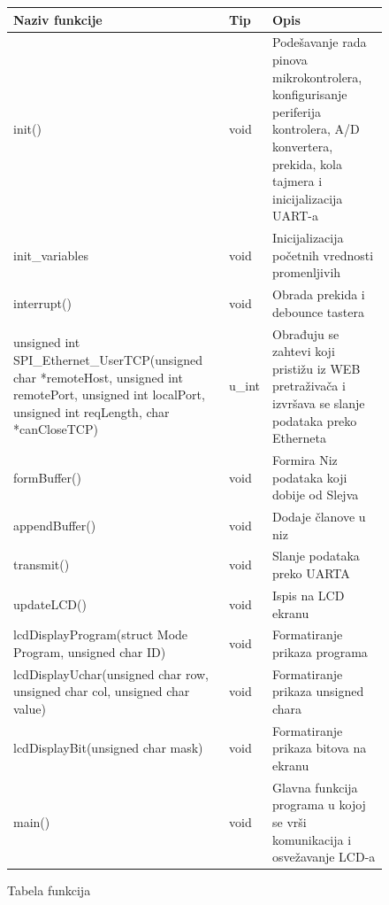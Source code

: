 \documentclass[12pt]{article}
\numberwithin{figure}{section}
\begin{document}
\begin{figure}[ht]
  \caption{Tabela funkcija}
\begin{centering}
  \begin{tabular}{|p{5cm}|p{2cm}|p{8cm}|}
    \hline
      Naziv funkcije & Tip & Opis \\
    \hline
      init() & void & Podešavanje rada pinova mikrokontrolera, konfigurisanje periferija kontrolera, A/D konvertera, prekida, kola tajmera i inicijalizacija UART-a \\
    \hline
      init\_variables & void & Inicijalizacija početnih vrednosti promenljivih \\
    \hline 
     interrupt() & void & Obrada prekida i debounce tastera\\ 
     \hline
     unsigned int SPI\_Ethernet\_UserTCP(unsigned char *remoteHost, unsigned int remotePort, unsigned int localPort, unsigned int reqLength, char *canCloseTCP) & u\_int & Obrađuju se zahtevi koji pristižu iz WEB pretraživača i izvršava se slanje podataka preko Etherneta \\
     \hline
     formBuffer() & void & Formira Niz podataka koji dobije od Slejva \\ 
     \hline
     appendBuffer() & void & Dodaje članove u niz \\
     \hline
     transmit() & void & Slanje podataka preko UARTA \\
     \hline
     updateLCD() & void & Ispis na LCD ekranu \\ 
     \hline
     lcdDisplayProgram(struct Mode Program, unsigned char ID) & void & Formatiranje prikaza programa \\
     \hline
     lcdDisplayUchar(unsigned char row, unsigned char col, unsigned char value) & void & Formatiranje prikaza unsigned chara \\
     \hline 
     lcdDisplayBit(unsigned char mask) & void & Formatiranje prikaza bitova na ekranu \\
     \hline
     main() & void & Glavna funkcija programa u kojoj se vrši komunikacija i osvežavanje LCD-a \\
     \hline
   \end{tabular}
\end{centering}
\end{figure}


\clearpage
\end{document}
